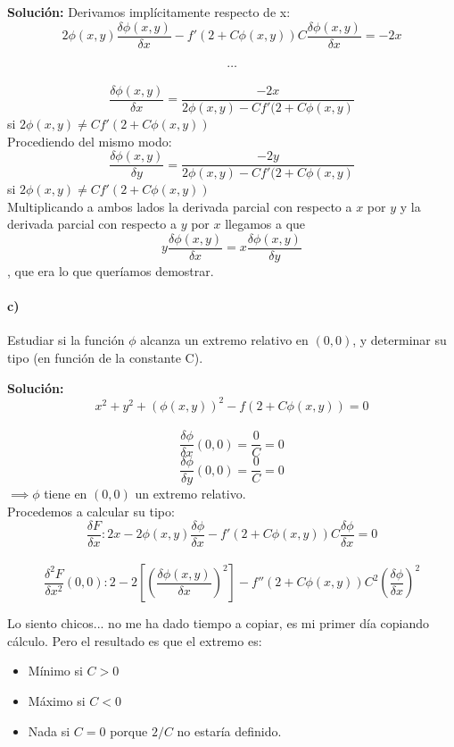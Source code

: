 \documentclass{apuntes}
\begin{document}
\textbf{Solución:}
Derivamos implícitamente respecto de x:\\
$$2\phi (x,y) \frac{\delta \phi (x,y)}{\delta x} - f'(2+C\phi (x,y))C\frac{\delta \phi (x,y)}{\delta x}=-2x$$\\
$$\hdots$$\\
$$\frac{\delta \phi (x,y)}{\delta x} = \frac{-2x}{2\phi (x,y) - Cf'(2+C\phi (x,y)}$$ si $2\phi (x,y) \neq Cf'(2+C\phi (x,y))$
\\Procediendo del mismo modo: \\
$$\frac{\delta \phi (x,y)}{\delta y} = \frac{-2y}{2\phi (x,y) - Cf'(2+C\phi (x,y)}$$ si $2\phi (x,y) \neq Cf'(2+C\phi (x,y))$\\
Multiplicando a ambos lados la derivada parcial con respecto a $x$ por $y$ y la derivada parcial con respecto a $y$ por $x$ llegamos a que\\ $$y\frac{\delta \phi (x,y)}{\delta x} = x\frac{\delta \phi (x,y)}{\delta y}$$, que era lo que queríamos demostrar.

\paragraph{c)} Estudiar si la función $\phi$ alcanza un extremo relativo en $(0,0)$, y determinar su tipo (en función de la constante C).

\textbf{Solución:}\\
$$x^2 + y^2 + (\phi (x,y))^2 -f(2+C\phi (x,y)) = 0$$\\
$$\frac{\delta \phi}{\delta x}(0,0) = \frac{0}{C} = 0$$
$$\frac{\delta \phi}{\delta y}(0,0) = \frac{0}{C} = 0$$
$\implies \phi$ tiene en $(0,0)$ un extremo relativo.\\

Procedemos a calcular su tipo:\\
$$\frac{\delta F}{\delta x}: 2x-2\phi (x,y)\frac{\delta \phi}{\delta x}-f'(2+C\phi (x, y))C\frac{\delta \phi}{\delta x} = 0$$\\
$$\frac{\delta ^2 F}{\delta x^2}(0,0): 2-2[(\frac{\delta \phi (x,y)}{\delta x})^2] - f''(2+C\phi (x,y))C^2(\frac{\delta \phi}{\delta x})^2$$

Lo siento chicos... no me ha dado tiempo a copiar, es mi primer día copiando cálculo. Pero el resultado es que el extremo es:

\begin{itemize}
\item Mínimo si $C>0$
\item Máximo si $C<0$
\item Nada si $C=0$ porque $2/C$ no estaría definido. 
\end{itemize}
\end{document}
